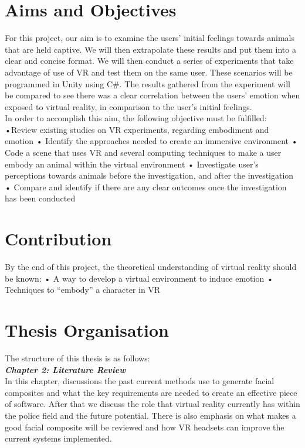 \documentclass[12pt]{report}
\begin{document}
\section{Aims and Objectives}
For this project, our aim is to examine the users’ initial feelings towards animals that are held captive. We will then extrapolate these results and put them into a clear and concise format. We will then conduct a series of experiments that take advantage of use of VR and test them on the same user. These scenarios will be programmed in Unity using C\#. The results gathered from the experiment will be compared to see there was a clear correlation between the users’ emotion when exposed to virtual reality, in comparison to the user’s initial feelings. 
\\

In order to accomplish this aim, the following objective must be fulfilled:
\\

•Review existing studies on VR experiments, regarding embodiment and emotion
•	Identify the approaches needed to create an immersive environment
•	Code a scene that uses VR and several computing techniques to make a user embody an animal within the virtual environment
•	Investigate user’s perceptions towards animals before the investigation, and after the investigation
•	Compare and identify if there are any clear outcomes once the investigation has been conducted

\section{Contribution}

By the end of this project, the theoretical understanding of virtual reality should be known:
•	A way to develop a virtual environment to induce emotion
•	Techniques to “embody” a character in VR

\section{Thesis Organisation}
The structure of this thesis is as follows:
\\

\textbf{\textit{Chapter 2: Literature Review}}
\\

In this chapter, discussions the past current methods use to generate facial composites and what the key requirements are needed to create an effective piece of software.
After that we discuss the role that virtual reality currently has within the police field and the future potential. 
There is also emphasis on what makes a good facial composite will be reviewed and how VR headsets can improve the current systems implemented. 
\\
\end{document}
